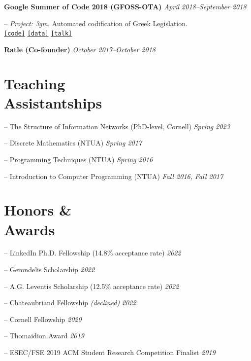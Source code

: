 \documentclass[margin]{res}
\newcommand{\specialurl}[2]{\href {#2} {\texttt{[#1]}}}
\newcommand{\code}[1]{\specialurl {code} {#1}}
\newcommand{\data}[1]{\specialurl {data} {#1}}
\newcommand{\talk}[1]{\specialurl {talk} {#1}}
\begin{document}
\begin{resume}
\textbf{Google Summer of Code 2018 (GFOSS-OTA)}  \hfill {\emph{April 2018--September 2018}}
\begin{compactitem}
\item[--] \emph{Project: 3gm}. Automated codification of Greek Legislation. \\ \code{https://github.com/eellak/gsoc2018-3gm} \data{https://archive.org/details/greekgovernmentgazette} \talk{https://www.youtube.com/watch?v=_UIGsy85Ehw}
\end{compactitem}

\textbf{Ratle (Co-founder)} \hfill {\emph{October 2017--October 2018}}

\section{Teaching \\ Assistantships} 
\begin{compactitem}
	\item[--] The Structure of Information Networks (PhD-level, Cornell) \hfill \emph{Spring 2023} 
    \item[--] Discrete Mathematics (NTUA) \hfill \emph{Spring 2017}
    \item[--] Programming Techniques (NTUA) \hfill \emph{Spring 2016}
    \item[--] Introduction to Computer Programming (NTUA) \hfill \emph{Fall 2016, Fall 2017}
\end{compactitem}


\section{Honors \& \\ Awards} 
\begin{compactitem}
	\item[--] LinkedIn Ph.D. Fellowship (14.8\% acceptance rate) \hfill \emph{2022} 	
	\item[--] Gerondelis Scholarship \hfill \emph{2022}
	\item[--] A.G. Leventis Scholarship (12.5\% acceptance rate) \hfill \emph{2022}
	\item[--] Chateaubriand Fellowship \emph{(declined)} \hfill \emph{2022}
	\item[--] Cornell Fellowship \hfill \emph{2020}
	\item[--] Thomaidion Award \hfill \emph{2019}
	\item[--] ESEC/FSE 2019 ACM Student Research Competition Finalist \hfill \emph{2019}


\end{compactitem}
\end{resume}
\end{document}
